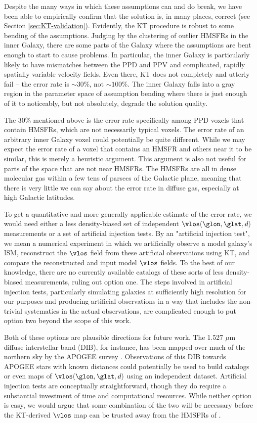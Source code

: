 Despite the many ways in which these assumptions can and do break, we have been able to empirically confirm that the solution is, in many places, correct (see Section \ref{sec:KT-validation}). 
Evidently, the KT procedure is robust to some bending of the assumptions.
Judging by the clustering of outlier HMSFRs in the inner Galaxy, there are some parts of the Galaxy where the assumptions are bent enough to start to cause problems.
In particular, the inner Galaxy is particularly likely to have mismatches between the PPD and PPV and complicated, rapidly spatially variable velocity fields.
Even there, KT does not completely and utterly fail -- the error rate is $\sim 30 \%$, not $\sim 100 \%$.
The inner Galaxy falls into a gray region in the parameter space of assumption bending where there is just enough of it to noticeably, but not absolutely, degrade the solution quality.

The 30\% mentioned above is the error rate specifically among PPD voxels that contain HMSFRs, which are not necessarily typical voxels. 
The error rate of an arbitrary inner Galaxy voxel could potentially be quite different. 
While we may expect the error rate of a voxel that contains an HMSFR and others near it to be similar, this is merely a heuristic argument.
This argument is also not useful for parts of the space that are not near HMSFRs.
The HMSFRs are all in dense molecular gas within a few tens of parsecs of the Galactic plane, meaning that there is very little we can say about the error rate in diffuse gas, especially at high Galactic latitudes. 

To get a quantitative and more generally applicable estimate of the error rate, we would need either a less density-biased set of independent $\vlos(\glon, \glat, d)$ measurements or a set of artificial injection tests. 
By an "artificial injection test", we mean a numerical experiment in which we artificially observe a model galaxy's ISM, reconstruct the $\vlos$ field from these artificial observations using KT, and compare the reconstructed and input model $\vlos$ fields. 
To the best of our knowledge, there are no currently available catalogs of these sorts of less density-biased measurements, ruling out option one.
The steps involved in artificial injection tests, particularly simulating galaxies at sufficiently high resolution for our purposes and producing artificial observations in a way that includes the non-trivial systematics in the actual observations, are complicated enough to put option two beyond the scope of this work.

Both of these options are plausible directions for future work. 
The 1.527 $\mu$m diffuse interstellar band (DIB), for instance, has been mapped over much of the northern sky by the APOGEE survey \citep{2015ApJ...798...35Z}. 
Observations of this DIB towards APOGEE stars with known distances could potentially be used to build catalogs or even maps of $\vlos(\glon, \glat, d)$ using an independent dataset. 
Artificial injection tests are conceptually straightforward, though they do require a substantial investment of time and computational resources.
While neither option is easy, we would argue that some combination of the two will be necessary before the KT-derived $\vlos$ map can be trusted away from the HMSFRs of \Reid.
